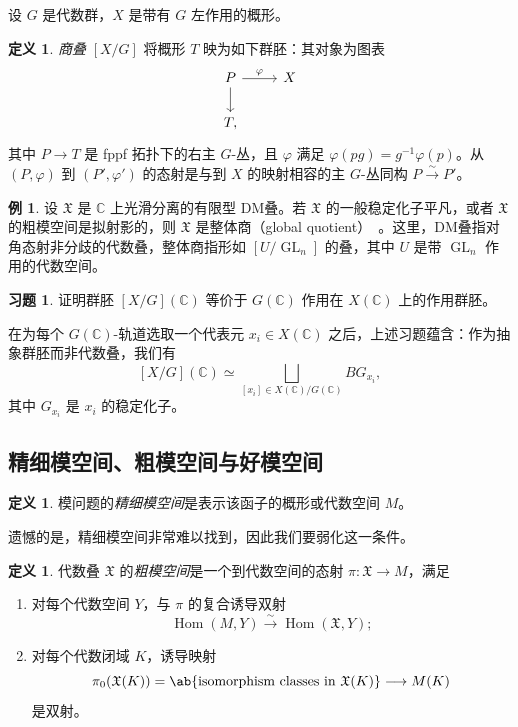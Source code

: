 \documentclass{amsart}
\theoremstyle{definition}
\newtheorem{defn}[thm]{定义}
\newtheorem{exm}[thm]{例}
\newtheorem{exer}[thm]{习题}
\theoremstyle{remark}
\theoremstyle{plain}
\theoremstyle{definition}
\theoremstyle{remark}
\newcommand{\C}{\mathbb{C}}
\newcommand{\mf}[1]{\mathfrak{#1}}
\newcommand{\on}[1]{\operatorname{#1}}
\newcommand{\1}{\mathbf{1}}
\newcommand{\2}{\mathbf{2}}
\newcommand{\3}{\mathbf{3}}
\begin{document}
设 \(G\) 是代数群，\(X\) 是带有 \(G\) 左作用的概形。

\begin{defn}
    \textit{商叠} \([X/G]\) 将概形 \(T\) 映为如下群胚：其对象为图表
    \begin{equation*}
    \begin{tikzcd}
        P \ar{r}{\varphi} \ar{d} & X \\
        T,
    \end{tikzcd}
    \end{equation*}
    其中 \(P\to T\) 是 fppf 拓扑下的右主 \(G\)-丛，且 \(\varphi\) 满足 \(\varphi(pg)=g^{-1}\varphi(p)\)。从 \((P,\varphi)\) 到 \((P',\varphi')\) 的态射是与到 \(X\) 的映射相容的主 \(G\)-丛同构 \(P\xrightarrow{\sim}P'\)。
\end{defn}

\begin{exm}
    设 \(\mf{X}\) 是 \(\C\) 上光滑分离的有限型 DM叠。若 \(\mf{X}\) 的一般稳定化子平凡，或者 \(\mf{X}\) 的粗模空间是拟射影的，则 \(\mf{X}\) 是整体商（global quotient）~\cite{EHKV2001}。这里，DM叠指对角态射非分歧的代数叠，整体商指形如 \([U/\on{GL}_n]\) 的叠，其中 \(U\) 是带 \(\on{GL}_n\) 作用的代数空间。
\end{exm}

\begin{exer}
    证明群胚 \([X/G](\C)\) 等价于 \(G(\C)\) 作用在 \(X(\C)\) 上的作用群胚。
\end{exer}

在为每个 \(G(\C)\)-轨道选取一个代表元 \(x_i\in X(\C)\) 之后，上述习题蕴含：作为抽象群胚而非代数叠，我们有
\[ 
    [X/G](\C) \simeq \bigsqcup_{[x_i] \in X(\C)/G(\C)} BG_{x_i}, 
\]
其中 \(G_{x_i}\) 是 \(x_i\) 的稳定化子。


\subsection{精细模空间、粗模空间与好模空间}%
\label{sub:Fine vs coarse vs good moduli spaces}

\begin{defn}
    模问题的\textit{精细模空间}是表示该函子的概形或代数空间 \(M\)。
\end{defn}

遗憾的是，精细模空间非常难以找到，因此我们要弱化这一条件。

\begin{defn}
    代数叠 \(\mf{X}\) 的\textit{粗模空间}是一个到代数空间的态射 \(\pi\colon\mf{X}\to M\)，满足
    \begin{enumerate}
        \item 对每个代数空间 \(Y\)，与 \(\pi\) 的复合诱导双射
        \[
            \on{Hom}(M,Y)\xrightarrow{\sim}\on{Hom}(\mf{X},Y);
        \]
        \item 对每个代数闭域 \(K\)，诱导映射
        \[
            \pi_0(\mf{X}(K))=\ab\{\text{isomorphism classes in }\mf{X}(K)\}
            \longrightarrow M(K)
        \]
        是双射。
    \end{enumerate}
\end{defn}
\end{document}
